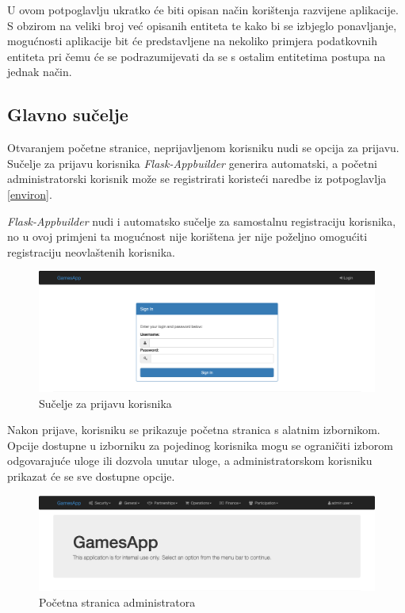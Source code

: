 \documentclass[times, utf8, diplomski]{fer}
\begin{document}
U ovom potpoglavlju ukratko će biti opisan način korištenja razvijene
aplikacije. S obzirom na veliki broj već opisanih entiteta te kako bi se
izbjeglo ponavljanje, mogućnosti aplikacije bit će predstavljene na nekoliko
primjera podatkovnih entiteta pri čemu će se podrazumijevati da se s ostalim
entitetima postupa na jednak način.

\subsection{Glavno sučelje}

Otvaranjem početne stranice, neprijavljenom korisniku nudi se opcija za prijavu.
Sučelje za prijavu korisnika \emph{Flask-Appbuilder} generira automatski, a
početni administratorski korisnik može se registrirati koristeći naredbe iz
potpoglavlja \ref{environ}.

\emph{Flask-Appbuilder} nudi i automatsko sučelje za samostalnu registraciju
korisnika, no u ovoj primjeni ta mogućnost nije korištena jer nije poželjno
omogućiti registraciju neovlaštenih korisnika.

\begin{figure}[H]
    \centering
    \includegraphics[width=1\textwidth]{slike/loginscreen.png}
    \caption{Sučelje za prijavu korisnika}
    \label{fig:loginscreen}
\end{figure}

Nakon prijave, korisniku se prikazuje početna stranica s alatnim izbornikom.
Opcije dostupne u izborniku za pojedinog korisnika mogu se ograničiti izborom
odgovarajuće uloge ili dozvola unutar uloge, a administratorskom korisniku
prikazat će se sve dostupne opcije.

\begin{figure}[H]
    \centering
    \includegraphics[width=1\textwidth]{slike/adminmain.png}
    \caption{Početna stranica administratora}
    \label{fig:adminmain}
\end{figure}
\end{document}
